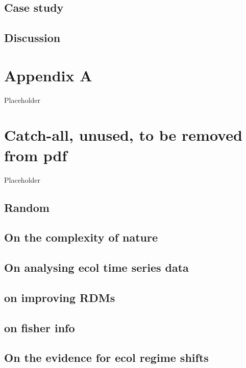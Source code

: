 \documentclass[12pt,twoside,openany]{reedthesis}
\begin{document}
\section{Case study}\label{case-study-1}

\section{Discussion}\label{discussion-2}

\chapter*{Appendix A}\label{rRDM}

Placeholder

\chapter*{Catch-all, unused, to be removed from
pdf}\label{catch-all-unused-to-be-removed-from-pdf}

Placeholder

\section{Random}\label{random}

\section{On the complexity of nature}\label{on-the-complexity-of-nature}

\section{On analysing ecol time series
data}\label{on-analysing-ecol-time-series-data}

\section{on improving RDMs}\label{on-improving-rdms}

\section{on fisher info}\label{on-fisher-info}

\section{On the evidence for ecol regime
shifts}\label{on-the-evidence-for-ecol-regime-shifts}
\end{document}
